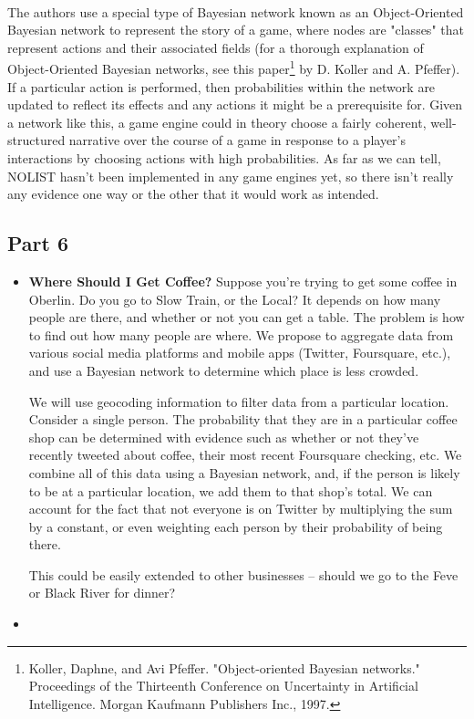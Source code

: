 \documentclass[11pt]{article}
\begin{document}
\begin{itemize}
\\ The authors use a special type of Bayesian network known as an Object-Oriented Bayesian network to represent the story of a game, where nodes are "classes" that represent actions and their associated fields (for a thorough explanation of Object-Oriented Bayesian networks, see this paper\footnote{Koller, Daphne, and Avi Pfeffer. "Object-oriented Bayesian networks." Proceedings of the Thirteenth Conference on Uncertainty in Artificial Intelligence. Morgan Kaufmann Publishers Inc., 1997.} by D. Koller and A. Pfeffer). If a particular action is performed, then probabilities within the network are updated to reflect its effects and any actions it might be a prerequisite for. Given a network like this, a game engine could in theory choose a fairly coherent, well-structured narrative over the course of a game in response to a player's interactions by choosing actions with high probabilities. As far as we can tell, NOLIST hasn't been implemented in any game engines yet, so there isn't really any evidence one way or the other that it would work as intended. 
\end{itemize}
\subsection*{Part 6}
\begin{itemize}
\item \textbf{Where Should I Get Coffee?} Suppose you're trying to get some coffee in Oberlin. Do you go to Slow Train, or the Local? It depends on how many people are there, and whether or not you can get a table. The problem is how to find out how many people are where. We propose to aggregate data from various social media platforms and mobile apps (Twitter, Foursquare, etc.), and use a Bayesian network to determine which place is less crowded.

We will use geocoding information to filter data from a particular location. Consider a single person. The probability that they are in a particular coffee shop can be determined with evidence such as whether or not they've recently tweeted about coffee, their most recent Foursquare checking, etc. We combine all of this data using a Bayesian network, and, if the person is likely to be at a particular location, we add them to that shop's total. We can account for the fact that not everyone is on Twitter by multiplying the sum by a constant, or even weighting each person by their probability of being there.

This could be easily extended to other businesses -- should we go to the Feve or Black River for dinner?
\item
\end{itemize}
\end{document}
